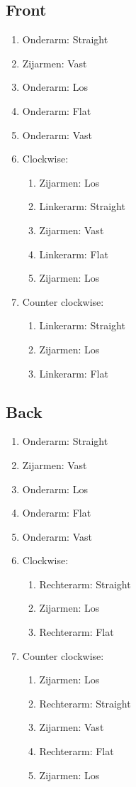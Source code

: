 \subsection{Front}

\begin{enumerate}
	\item Onderarm: Straight
	\item Zijarmen: Vast
	\item Onderarm: Los
	\item Onderarm: Flat
	\item Onderarm: Vast
	\item Clockwise:
	\begin{enumerate}
		\item Zijarmen: Los
		\item Linkerarm: Straight
		\item Zijarmen: Vast
		\item Linkerarm: Flat
		\item Zijarmen: Los
	\end{enumerate}
	\item Counter clockwise:
	\begin{enumerate}
		\item Linkerarm: Straight
		\item Zijarmen: Los
		\item Linkerarm: Flat
	\end{enumerate}
\end{enumerate}
\newpage

\subsection{Back}

\begin{enumerate}
	\item Onderarm: Straight
	\item Zijarmen: Vast
	\item Onderarm: Los
	\item Onderarm: Flat
	\item Onderarm: Vast
	\item Clockwise:
	\begin{enumerate}
		\item Rechterarm: Straight
		\item Zijarmen: Los
		\item Rechterarm: Flat
	\end{enumerate}
	\item Counter clockwise:
	\begin{enumerate}
		\item Zijarmen: Los
		\item Rechterarm: Straight
		\item Zijarmen: Vast
		\item Rechterarm: Flat
		\item Zijarmen: Los
	\end{enumerate}
\end{enumerate}
\newpage

